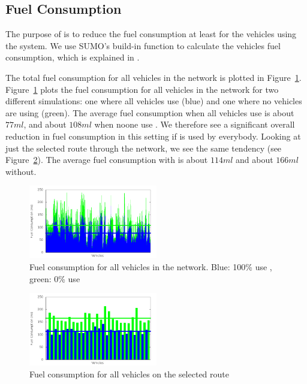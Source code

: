 %
%
%
\subsection{Fuel Consumption}
The purpose of \tech is to reduce the fuel consumption at least for the vehicles using the system. 
We use SUMO's build-in function to calculate the vehicles fuel consumption, which is explained in \cite{SUMOFuel}.

The total fuel consumption for all vehicles in the network is plotted in Figure~\ref{fig:TestResults:fuelTotal}.
Figure~\ref{fig:TestResults:fuelTotal} plots the fuel consumption for all vehicles in the network for two different simulations: one where all vehicles use \tech (blue) and one where no vehicles are using \tech (green).
The average fuel consumption when all vehicles use \tech is about $77 ml$, and about $108 ml$ when noone use \tech.
We therefore see a significant overall reduction in fuel consumption in this setting if \tech is used by everybody.
Looking at just the selected route through the network, we see the same tendency (see Figure~\ref{fig:TestResults:fuelRoute}). 
The average fuel consumption with \tech is about $114 ml$ and about $166 ml$ without. 
\begin{figure}[h]
\includegraphics[width=0.5\textwidth]{images/tp0/fuelTotal.png}
\caption{Fuel consumption for all vehicles in the network. Blue: 100\% use \tech, green: 0\% use \tech}
\label{fig:TestResults:fuelTotal}
\end{figure}
\begin{figure}[h]
\includegraphics[width=0.5\textwidth]{images/tp0/fuelRoute.png}
\caption{Fuel consumption for all vehicles on the selected route}
\label{fig:TestResults:fuelRoute}
\end{figure}

